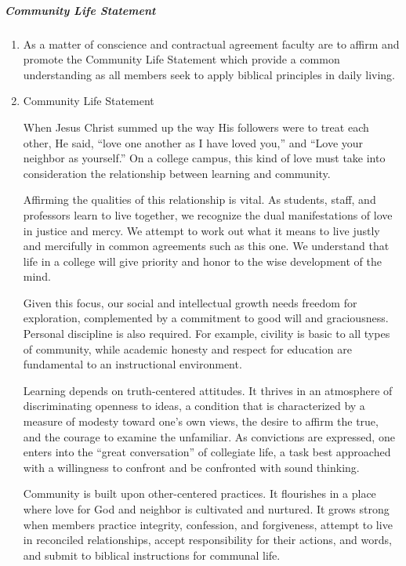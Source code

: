 				\subparagraph{Community Life Statement}
					\label{sec:CommunityLifeStatement}
					\begin{enumerate}[label=\alph*)]
						\item{As a matter of conscience and contractual agreement faculty are to affirm and promote the Community Life Statement which provide a common understanding as all members seek to apply biblical principles in daily living.}
						\item{Community Life Statement

							\quad When Jesus Christ summed up the way His followers were to treat each other, He said, ``love one another as I have loved you,'' and ``Love your neighbor as yourself.''  On a college campus, this kind of love must take into consideration the relationship between learning and community.

							\quad Affirming the qualities of this relationship is vital.  As students, staff, and professors learn to live together, we recognize the dual manifestations of love in justice and mercy.  We attempt to work out what it means to live justly and mercifully in common agreements such as this one.  We understand that life in a college will give priority and honor to the wise development of the mind.

							\quad Given this focus, our social and intellectual growth needs freedom for exploration, complemented by a commitment to good will and graciousness.  Personal discipline is also required.  For example, civility is basic to all types of community, while academic honesty and respect for education are fundamental to an instructional environment.

							\quad Learning depends on truth-centered attitudes.  It thrives in an atmosphere of discriminating openness to ideas, a condition that is characterized by a measure of modesty toward one's own views, the desire to affirm the true, and the courage to examine the unfamiliar.  As convictions are expressed, one enters into the ``great conversation'' of collegiate life, a task best approached with a willingness to confront and be confronted with sound thinking.

							\quad Community is built upon other-centered practices.  It flourishes in a place where love for God and neighbor is cultivated and nurtured.  It grows strong when members practice integrity, confession, and forgiveness, attempt to live in reconciled relationships, accept responsibility for their actions, and words, and submit to biblical instructions for communal life.

}
\end{enumerate}
